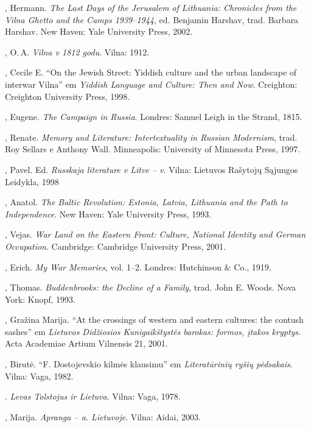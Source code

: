 \begin{bibliohedra}
  , Hermann. \textit{The Last Days of the Jerusalem of Lithuania:
  Chronicles from the Vilna Ghetto and the Camps 1939--1944}, ed.
  Benjamin Harshav, trad. Barbara Harshav. New Haven: Yale University
  Press, 2002.

  , O.\,A. \textit{Vilna v 1812 godu}. Vilna: 1912.

  , Cecile E. ``On the Jewish Street: Yiddish culture and the
  urban landscape of interwar Vilna'' em \textit{Yiddish Language and
  Culture: Then and Now}. Creighton: Creighton University Press, 1998.

  , Eugene. \textit{The Campaign in Russia}. Londres: Samuel Leigh
  in the Strand, 1815.

  , Renate. \textit{Memory and Literature: Intertextuality in
  Russian Modernism}, trad. Roy Sellars e Anthony Wall. Minneapolis:
  University of Minnesota Press, 1997.

  , Pavel. Ed. \textit{Russkaja literature v Litve -- v}.
  Vilna: Lietuvos Rašytojų Sąjungos Leidykla, 1998

  , Anatol. \textit{The Baltic Revolution: Estonia, Latvia,
  Lithuania and the Path to Independence}. New Haven: Yale University
  Press, 1993.

  , Vejas. \textit{War Land on the Eastern Front: Culture,
  National Identity and German Occupation}. Cambridge: Cambridge
  University Press, 2001.

  , Erich. \textit{My War Memories}, vol. 1--2. Londres:
  Hutchinson \& Co., 1919.

  , Thomas. \textit{Buddenbrooks: the Decline of a Family}, trad. John
  E. Woods. Nova York: Knopf, 1993.

  , Gražina Marija. ``At the crossings of western and
  eastern cultures: the contush sashes'' em \textit{Lietuvos Didžiosios
  Kunigaikštystės barokas: formos, įtakos kryptys.} Acta Academiae
  Artium Vilnensis 21, 2001.

  , Birutė. ``F. Dostojevskio kilmės klausimu'' em
  \textit{Literatūrinių ryšių pėdsakais}. Vilna: Vaga, 1982.

  \titidem. \textit{Levas Tolstojus ir Lietuva}. Vilna: Vaga,
  1978.

  , Marija. \textit{Apranga -- a. Lietuvoje}. Vilna:
  Aidai, 2003.


\end{bibliohedra}
